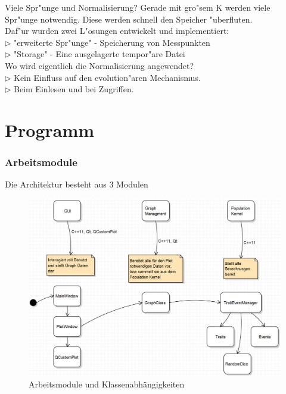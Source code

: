 \documentclass{beamer}
\begin{document}
\begin{frame}{Viele Spr"unge und Normalisierung?}
Gerade mit gro"sem K werden viele Spr"unge notwendig. Diese werden schnell den Speicher "uberfluten.\pause\bigskip\\
Daf"ur wurden zwei L"osungen entwickelt und implementiert:\\
$ \rhd $ "{}erweiterte Spr"unge"{} - Speicherung von Messpunkten\\
$ \rhd $ "{}Storage"{} - Eine ausgelagerte tempor"are Datei\bigskip\\\pause
Wo wird eigentlich die Normalisierung angewendet?\\\pause
$ \rhd $ Kein Einfluss auf den evolution"aren Mechanismus.\\
$ \rhd $ Beim Einlesen und bei Zugriffen.\\
\end{frame}

\section{Programm}
\begin{frame}
	\frametitle{Arbeitsmodule}
	Die Architektur besteht aus 3 Modulen
	\pause
	\begin{figure}[H]
		\centering
		\includegraphics[width=0.8\linewidth]{./Pictures/Bild_Module}
		\caption[Module]{Arbeitsmodule und Klassenabhängigkeiten}
		\label{Module und Klassen}
	\end{figure}
\end{frame}
\end{document}
